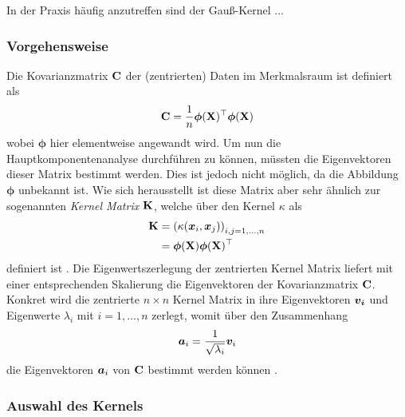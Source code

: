 In der Praxis häufig anzutreffen sind der Gauß-Kernel ...


\subsubsection{Vorgehensweise}
\label{ch:MethodenDerDimRed:statistisch:kPCA:Vorgehensweise}
Die Kovarianzmatrix $\mathbf{C}$ der (zentrierten) Daten im Merkmalsraum ist definiert als
\begin{equation}
	\mathbf{C} = \frac{1}{n} \bm{\phi}(\mathbf{X})^\top \bm{\phi}(\mathbf{X})
\end{equation}
wobei $\bm{\phi}$ hier elementweise angewandt wird. Um nun die Hauptkomponentenanalyse durchführen zu können, müssten die Eigenvektoren dieser Matrix bestimmt werden. Dies ist jedoch nicht möglich, da die Abbildung $\bm{\phi}$ unbekannt ist. Wie sich herausstellt ist diese Matrix aber sehr ähnlich zur sogenannten \textit{Kernel Matrix} $\mathbf{K}$, welche über den Kernel $\kappa$ als
\begin{align}
	\mathbf{K} & = \left( \kappa(\bm{x}_i, \bm{x}_j) \right)_{i,j = 1,\ldots,n} \label{eq:kPCA:KernelMatrix_A} \\
	        & = \bm{\phi}(\mathbf{X}) \bm{\phi}(\mathbf{X})^\top \label{eq:kPCA:KernelMatrix_B}
\end{align}
definiert ist \parencite[68]{ShaweTaylor.2011}. Die Eigenwertszerlegung der zentrierten Kernel Matrix liefert mit
einer entsprechenden Skalierung die Eigenvektoren der Kovarianzmatrix $\mathbf{C}$. Konkret wird die
zentrierte $n \times n$ Kernel Matrix in ihre Eigenvektoren $\bm{v_i}$ und Eigenwerte $\lambda_i$
mit $i = 1, \ldots, n$ zerlegt, womit über den Zusammenhang
\begin{equation}
	\label{eq:kPCA:ZusammenhangEigenvektoren}
	\bm{a}_i = \frac{1}{\sqrt{\lambda_i}} \bm{v}_i
\end{equation}
die Eigenvektoren $\bm{a}_i$ von $\mathbf{C}$ bestimmt werden können \parencite[142]{ShaweTaylor.2011}.

\subsubsection{Auswahl des Kernels}
\label{ch:MethodenDerDimRed:statistisch:kPCA:AuswahlKF}

